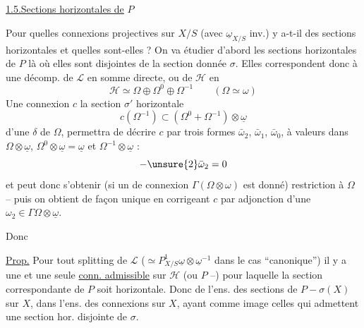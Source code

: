 \uline{1.5.}\quad\uline{Sections horizontales de} $P$

Pour quelles connexions projectives sur $X/S$ (avec $\underline{\omega}_{X/S}$ inv.) y a-t-il des sections horizontales  et quelles sont-elles ? On va étudier d'abord les sections horizontales de $P$ là où elles sont disjointes de la section donnée $\sigma$. Elles correspondent donc à une décomp. de $\mathcal{L}$ en somme directe, ou de $\mathcal{H}$ en
\[
\mathcal{H}\simeq\Omega\oplus\Omega^0\oplus\Omega^{-1}\qquad(\Omega\simeq\omega)
\]
 Une connexion $c$  la section $\sigma'$ horizontale  
\[
c(\Omega^{-1})\subset(\Omega^0+\Omega^{-1})\otimes\underline{\omega}
\]
 d'une  $\delta$ de $\Omega$, permettra de décrire $c$ par trois formes $\bar\omega_2$, $\bar\omega_1$, $\bar\omega_0$, à valeurs dans $\Omega\otimes\underline{\omega}$, $\Omega^0\otimes\underline{\omega}=\underline{\omega}$ et $\Omega^{-1}\otimes\underline{\omega}$ :
\[
-\unsure{2}\bar\omega_2=0
\]
 et peut donc s'obtenir (si un  de connexion  $\Gamma(\Omega\otimes\omega)$ est donné)    restriction à $\Omega$ -- puis on obtient de façon unique en corrigeant $c$ par adjonction d'une $\omega_2\in\Gamma\Omega\otimes\underline{\omega}$.

Donc

\uline{Prop.} Pour tout splitting de  $\mathcal{L}$ ($\simeq P^1_{X/S}\underline{\omega}\otimes\underline{\omega}^{-1}$ dans le cas ``canonique'') il y a une et une seule \uline{conn. admissible} sur $\mathcal{H}$ (ou $P$ --) pour laquelle la section correspondante de $P$ soit horizontale. Donc    de l'ens. des sections de $P-\sigma(X)$ sur $X$,  dans l'ens. des connexions  sur $X$, ayant comme image celles qui admettent une section hor. disjointe de $\sigma$.
